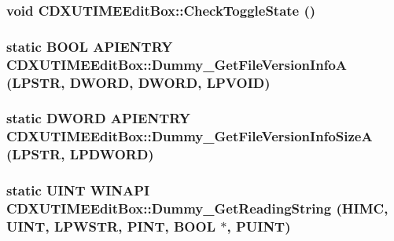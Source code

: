 \label{class_c_d_x_u_t_i_m_e_edit_box_a77eef5eb2d0b144a985692d8a4cd5d3c}
\hypertarget{class_c_d_x_u_t_i_m_e_edit_box_a6b51f5a9a9170a89b0430224b0d56757}{
\subsubsection[{CheckToggleState}]{\setlength{\rightskip}{0pt plus 5cm}void CDXUTIMEEditBox::CheckToggleState ()}}
\label{class_c_d_x_u_t_i_m_e_edit_box_a6b51f5a9a9170a89b0430224b0d56757}
\hypertarget{class_c_d_x_u_t_i_m_e_edit_box_aa34e1f7d0fb0b2fcd5d668d6f95db8db}{
\subsubsection[{Dummy\_\-GetFileVersionInfoA}]{\setlength{\rightskip}{0pt plus 5cm}static {\bf BOOL} APIENTRY CDXUTIMEEditBox::Dummy\_\-GetFileVersionInfoA ({\bf LPSTR}, \/  {\bf DWORD}, \/  {\bf DWORD}, \/  {\bf LPVOID})}}
\label{class_c_d_x_u_t_i_m_e_edit_box_aa34e1f7d0fb0b2fcd5d668d6f95db8db}
\hypertarget{class_c_d_x_u_t_i_m_e_edit_box_a1d4b814a9bc32ee6b96e73a1d0cd8783}{
\subsubsection[{Dummy\_\-GetFileVersionInfoSizeA}]{\setlength{\rightskip}{0pt plus 5cm}static {\bf DWORD} APIENTRY CDXUTIMEEditBox::Dummy\_\-GetFileVersionInfoSizeA ({\bf LPSTR}, \/  {\bf LPDWORD})}}
\label{class_c_d_x_u_t_i_m_e_edit_box_a1d4b814a9bc32ee6b96e73a1d0cd8783}
\hypertarget{class_c_d_x_u_t_i_m_e_edit_box_a54618d363797a91b5e1f42da21f66c82}{
\subsubsection[{Dummy\_\-GetReadingString}]{\setlength{\rightskip}{0pt plus 5cm}static {\bf UINT} WINAPI CDXUTIMEEditBox::Dummy\_\-GetReadingString ({\bf HIMC}, \/  {\bf UINT}, \/  {\bf LPWSTR}, \/  {\bf PINT}, \/  {\bf BOOL} $\ast$, \/  {\bf PUINT})}}
